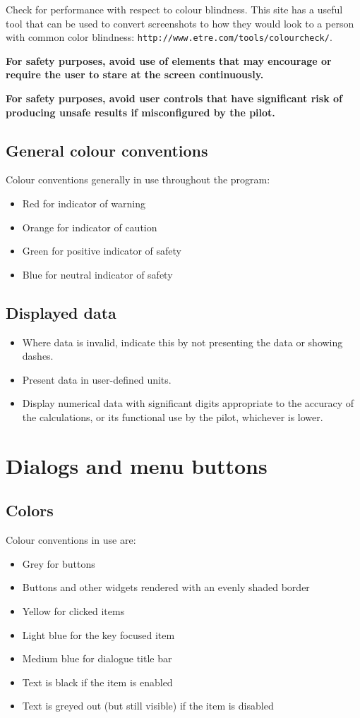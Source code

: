 \documentclass[a4paper,12pt]{refrep}
\begin{document}
Check for performance with respect to colour blindness.
This site has a useful tool that can be used to convert screenshots
to how they would look to a person with common color blindness:
\verb|http://www.etre.com/tools/colourcheck/|.

{\bf For safety purposes, avoid use of elements that may encourage or require 
the user to stare at the screen continuously.}

{\bf For safety purposes, avoid user controls that have significant risk of 
producing unsafe results if misconfigured by the pilot.}

\subsection{General colour conventions}
Colour conventions generally in use throughout the program:
\begin{itemize}
\item Red for indicator of warning
\item Orange for indicator of caution
\item Green for positive indicator of safety
\item Blue for neutral indicator of safety
\end{itemize}

\subsection{Displayed data}
\begin{itemize}
\item Where data is invalid, indicate this by not presenting the data or
  showing dashes.
\item Present data in user-defined units.
\item Display numerical data with significant digits appropriate to the accuracy of the
  calculations, or its functional use by the pilot, whichever is lower.
\end{itemize}

\section{Dialogs and menu buttons}

\subsection{Colors}
Colour conventions in use are:
\begin{itemize}
\item Grey for buttons
\item Buttons and other widgets rendered with an evenly shaded border
\item Yellow for clicked items
\item Light blue for the key focused item
\item Medium blue for dialogue title bar
\item Text is black if the item is enabled
\item Text is greyed out (but still visible) if the item is disabled
\end{itemize}
\end{document}
